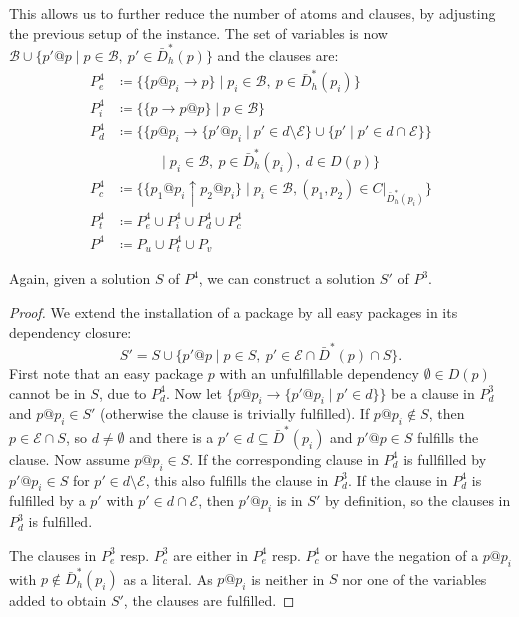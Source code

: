 \documentclass[halfparskip,11pt]{scrartcl}
\begin{document}
This allows us to further reduce the number of atoms and clauses, by adjusting the previous setup of the instance. The set of variables is now $\mathcal B \cup \{p'@p \mid p \in \mathcal B,\  p'\in \bar D_h^*(p)\}$ and the clauses are: 
\begin{align*}
P^4_e &\coloneqq \{ \{p@p_i \to p\} \mid p_i \in\mathcal B,\ p\in \bar D_h^*(p_i)\} \\
P^4_i &\coloneqq \{ \{p \to  p@p\} \mid p \in\mathcal B\} \\
P^4_d &\coloneqq \{ \{p@p_i \to \{p'@p_i \mid p'\in d\setminus \mathcal E\} \cup \{p' \mid p'\in d\cap \mathcal E\}\} \\
&\quad\quad\quad \mid p_i\in \mathcal B,\ p \in \bar D_h^*(p_i), \ d \in D(p)\}\\
P^4_c &\coloneqq \{ \{p_1@p_i \uparrow p_2@p_i\} \mid p_i\in \mathcal B, (p_1,p_2)\in C|_{\bar D_h^*(p_i)}\}\\
P^4_t &\coloneqq P^4_e \cup P^4_i \cup P^4_d \cup P^4_c \\
P^4 &\coloneqq P_u \cup P^4_t \cup P_v
\end{align*}

Again, given a solution $S$ of $P^4$, we can construct a solution $S'$ of $P^3$.

\begin{proof}
We extend the installation of a package by all easy packages in its dependency closure:
\[
S' = S \cup \{p'@p \mid p\in S,\ p'\in \mathcal E \cap \bar D^*(p) \cap S\}.
\]
First note that an easy package $p$ with an unfulfillable dependency $\emptyset \in D(p)$ cannot be in $S$, due to $P_d^4$.
Now let $\{p@p_i \to \{p'@p_i\mid p'\in d\}\}$ be a clause in $P_d^3$ and $p@p_i\in S'$ (otherwise the clause is trivially fulfilled). If $p@p_i\notin S$, then $p\in \mathcal E \cap S$, so $d\ne \emptyset$ and there is a $p' \in d \subseteq \bar D^*(p_i)$ and $p'@p\in S$ fulfills the clause. Now assume $p@p_i \in S$. If the corresponding clause in $P^4_d$ is fullfilled by $p'@p_i\in S$ for $p' \in d\setminus\mathcal E$, this also fulfills the clause in $P_d^3$. If the clause in $P^4_d$ is fulfilled by a $p'$ with $p'\in d\cap \mathcal E$, then $p'@p_i$ is in $S'$ by definition, so the clauses in $P^3_d$ is fulfilled.

The clauses in $P_e^3$ resp. $P_c^3$ are either in $P_e^4$ resp. $P_c^4$ or have the negation of a $p@p_i$ with $p \notin \bar D_h^*(p_i)$ as a literal. As $p@p_i$ is neither in $S$ nor one of the variables added to obtain $S'$, the clauses are fulfilled.
\end{proof}
\end{document}
